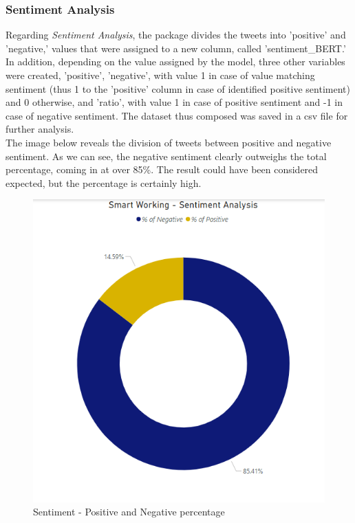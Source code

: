 \documentclass[12pt,journal,compsoc]{IEEEtran}
\begin{document}
\subsubsection{Sentiment Analysis}
Regarding \textit{Sentiment Analysis}, the package divides the tweets into 'positive' and 'negative,' values that were assigned to a new column, called 'sentiment\_BERT.' In addition, depending on the value assigned by the model, three other variables were created, 'positive', 'negative', with value 1 in case of value matching sentiment (thus 1 to the 'positive' column in case of identified positive sentiment) and 0 otherwise, and 'ratio', with value 1 in case of positive sentiment and -1 in case of negative sentiment. The dataset thus composed was saved in a csv file for further analysis.\\
The image below reveals the division of tweets between positive and negative sentiment. As we can see, the negative sentiment clearly outweighs the total percentage, coming in at over 85\%. The result could have been considered expected, but the percentage is certainly high.

\begin{figure}[H]
\begin{center}
  \includegraphics[scale=0.7]{./images/pie-sentiment.png}
\end{center}  
  \caption{Sentiment - Positive and Negative percentage}
\end{figure}
\end{document}
